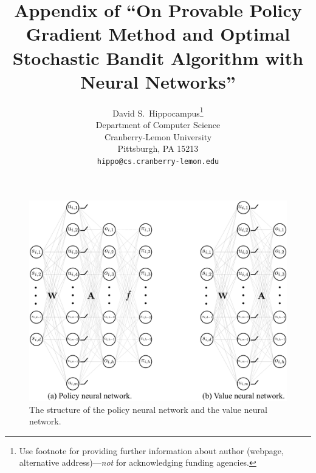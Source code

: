 \documentclass{article}
\title{Appendix of ``On Provable Policy Gradient Method and Optimal Stochastic Bandit Algorithm with Neural Networks''}
\author{%
  David S.~Hippocampus\thanks{Use footnote for providing further information
    about author (webpage, alternative address)---\emph{not} for acknowledging
    funding agencies.} \\
  Department of Computer Science\\
  Cranberry-Lemon University\\
  Pittsburgh, PA 15213 \\
  \texttt{hippo@cs.cranberry-lemon.edu} \\
}
\begin{document}
\maketitle

\appendix




{\small


}

\newpage

\begin{figure}[h]
	\begin{center}
		\centerline{\includegraphics[width=0.9\columnwidth]{nn_policy_value_vertical.pdf}}
		\caption{The structure of the policy neural network and the value neural network.}
		\label{fig:nn_policy_value}
	\end{center}
	\vskip -0.2in
\end{figure}

\newpage
\end{document}
